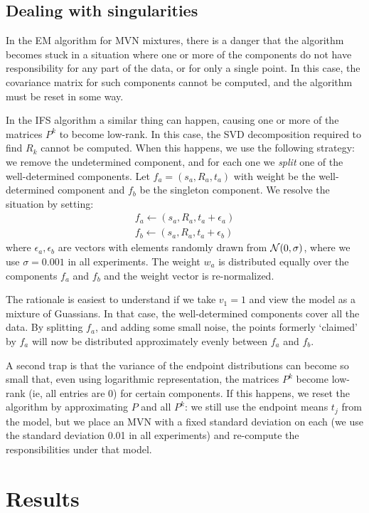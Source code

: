 \subsection{Dealing with singularities}

In the EM algorithm for MVN mixtures, there is a danger that the algorithm becomes stuck in a situation where one or more of the components do not have responsibility for any part of the data, or for only a single point. In this case, the covariance matrix for such components cannot be computed, and the algorithm must be reset in some way.

In the IFS algorithm a similar thing can happen, causing one or more of the matrices $P^k$ to become low-rank. In this case, the SVD decomposition required to find $R_k$ cannot be computed. When this happens, we use the following strategy: we remove the undetermined component, and for each one we \emph{split} one of the well-determined components. Let $f_a = (s_a, R_a, t_a)$ with weight be the well-determined component and $f_b$ be the singleton component. We resolve the situation by setting:
\begin{align*}
f_a \leftarrow (s_a, R_a, t_a + \epsilon_a)\\
f_b \leftarrow (s_a, R_a, t_a + \epsilon_b) 
\end{align*}
where $\epsilon_a, \epsilon_b$ are vectors with elements randomly drawn from ${\cal N}(0, \sigma)$, where we use $\sigma = 0.001$ in all experiments. The weight $w_a$ is distributed equally over the components $f_a$ and $f_b$ and the weight vector is re-normalized.
 
The rationale is easiest to understand if we take $v_1=1$ and view the model as a mixture of Guassians. In that case, the well-determined components cover all the data. By splitting $f_a$, and adding some small noise, the points formerly `claimed' by $f_a$ will now be distributed approximately evenly between $f_a$ and $f_b$. 

A second trap is that the variance of the endpoint distributions can become so small that, even using logarithmic representation, the matrices $P^k$ become low-rank (ie, all entries are $0$) for certain components. If this happens, we reset the algorithm by approximating $P$  and all $P^k$: we still use the endpoint means $t_j$ from the model, but we place an MVN with a fixed standard deviation on each (we use the standard deviation 0.01 in all experiments) and re-compute the responsibilities under that model.

\section{Results}
\label{section:experiments}

